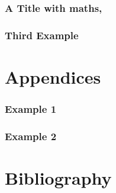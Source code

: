 \documentclass[12pt]{article}
\begin{document}
\section{A Title with maths, }\label{Sec: A Title with Maths}

\blindtext 







\section{Third Example}\label{Sec: Third Example}

\blindtext 







\newpage
\appendix
\renewcommand{\thesection}{\Alph{section}}
\renewcommand{\thesubsection}{\roman{subsection}}
\renewcommand{\theequation}{A-\arabic{equation}}

\part*{Appendices}


\section{Example 1}

\section{Example 2}


\newpage
\part*{Bibliography}

\end{document}
